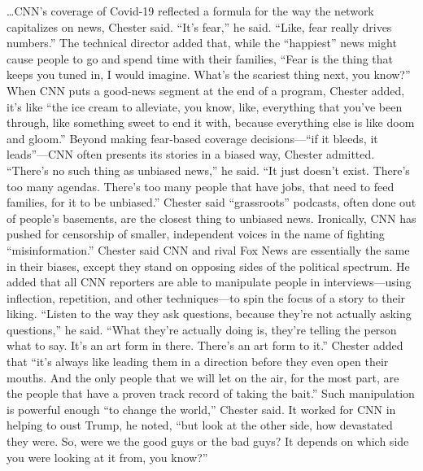 \begin{refsection}
\begin{tcolorbox}[quote]
\dots{}CNN's coverage of Covid-19 reflected a formula for the way the network capitalizes on news, Chester said. \enquote{It's fear,} he said. \enquote{Like, fear really drives numbers.} The technical director added that, while the \enquote{happiest} news might cause people to go and spend time with their families, \enquote{Fear is the thing that keeps you tuned in, I would imagine. What's the scariest thing next, you know?} When CNN puts a good-news segment at the end of a program, Chester added, it's like \enquote{the ice cream to alleviate, you know, like, everything that you've been through, like something sweet to end it with, because everything else is like doom and gloom.} Beyond making fear-based coverage decisions---\enquote{if it bleeds, it leads}---CNN often presents its stories in a biased way, Chester admitted. \enquote{There's no such thing as unbiased news,} he said. \enquote{It just doesn't exist. There's too many agendas. There's too many people that have jobs, that need to feed families, for it to be unbiased.} Chester said \enquote{grassroots} podcasts, often done out of people's basements, are the closest thing to unbiased news. Ironically, CNN has pushed for censorship of smaller, independent voices in the name of fighting \enquote{misinformation.} Chester said CNN and rival Fox News are essentially the same in their biases, except they stand on opposing sides of the political spectrum. He added that all CNN reporters are able to manipulate people in interviews---using inflection, repetition, and other techniques---to spin the focus of a story to their liking. \enquote{Listen to the way they ask questions, because they're not actually asking questions,} he said. \enquote{What they're actually doing is, they're telling the person what to say. It's an art form in there. There's an art form to it.} Chester added that \enquote{it's always like leading them in a direction before they even open their mouths. And the only people that we will let on the air, for the most part, are the people that have a proven track record of taking the bait.} Such manipulation is powerful enough \enquote{to change the world,} Chester said. It worked for CNN in helping to oust Trump, he noted, \enquote{but look at the other side, how devastated they were. So, were we the good guys or the bad guys? It depends on which side you were looking at it from, you know?}\textsuperscript{\cite{urlfads08ya}}

\end{tcolorbox}

\printbibliography[heading=subbibliography]

\end{refsection}